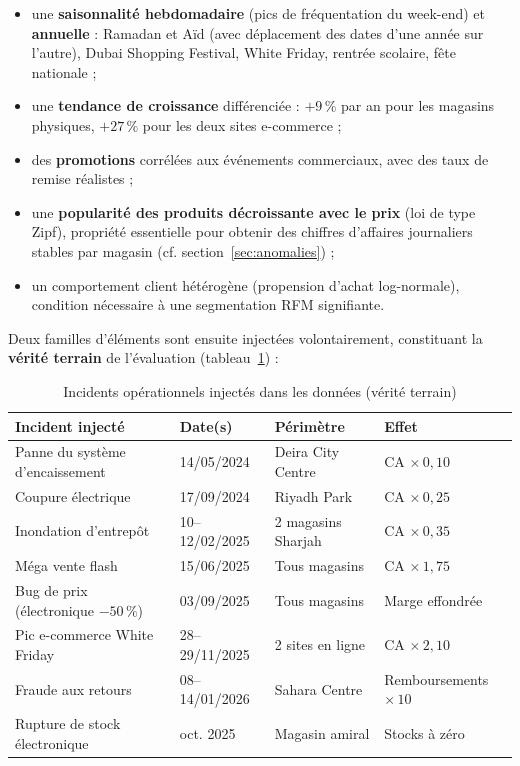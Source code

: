 \documentclass[12pt,a4paper]{report}
\begin{document}
\begin{itemize}
  \item une \textbf{saisonnalité hebdomadaire} (pics de fréquentation du
    week-end) et \textbf{annuelle} : Ramadan et Aïd (avec déplacement des
    dates d'une année sur l'autre), Dubai Shopping Festival, White Friday,
    rentrée scolaire, fête nationale ;
  \item une \textbf{tendance de croissance} différenciée : $+9\,\%$ par an pour
    les magasins physiques, $+27\,\%$ pour les deux sites e-commerce ;
  \item des \textbf{promotions} corrélées aux événements commerciaux, avec des
    taux de remise réalistes ;
  \item une \textbf{popularité des produits décroissante avec le prix}
    (loi de type Zipf), propriété essentielle pour obtenir des chiffres
    d'affaires journaliers stables par magasin (cf. section~\ref{sec:anomalies}) ;
  \item un comportement client hétérogène (propension d'achat log-normale),
    condition nécessaire à une segmentation RFM signifiante.
\end{itemize}

Deux familles d'éléments sont ensuite injectées volontairement, constituant la
\textbf{vérité terrain} de l'évaluation (tableau~\ref{tab:incidents}) :

\begin{table}[htbp]
  \centering
  \small
  \begin{tabular}{@{}p{5.6cm}llp{2.6cm}@{}}
    \toprule
    \textbf{Incident injecté} & \textbf{Date(s)} & \textbf{Périmètre} &
    \textbf{Effet} \\
    \midrule
    Panne du système d'encaissement & 14/05/2024 & Deira City Centre &
      CA $\times\,0{,}10$ \\
    Coupure électrique & 17/09/2024 & Riyadh Park & CA $\times\,0{,}25$ \\
    Inondation d'entrepôt & 10--12/02/2025 & 2 magasins Sharjah &
      CA $\times\,0{,}35$ \\
    Méga vente flash & 15/06/2025 & Tous magasins & CA $\times\,1{,}75$ \\
    Bug de prix (électronique $-50\,\%$) & 03/09/2025 & Tous magasins &
      Marge effondrée \\
    Pic e-commerce White Friday & 28--29/11/2025 & 2 sites en ligne &
      CA $\times\,2{,}10$ \\
    Fraude aux retours & 08--14/01/2026 & Sahara Centre &
      Remboursements $\times\,10$ \\
    Rupture de stock électronique & oct. 2025 & Magasin amiral &
      Stocks à zéro \\
    \bottomrule
  \end{tabular}
  \caption{Incidents opérationnels injectés dans les données (vérité terrain)}
  \label{tab:incidents}
\end{table}
\end{document}

